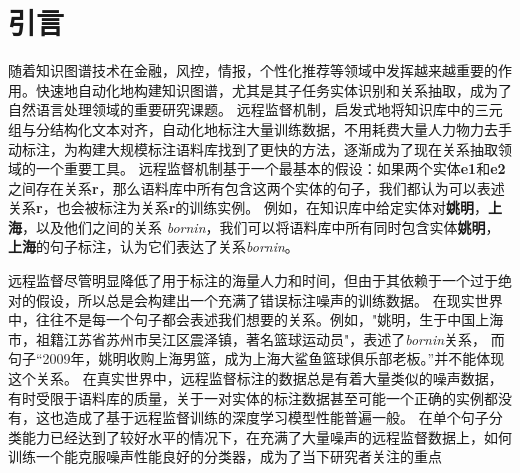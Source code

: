 \documentclass[UTF8]{csoarticle}
\begin{document}




\maketitle



\section{引言}
随着知识图谱技术在金融，风控，情报，个性化推荐等领域中发挥越来越重要的作用。快速地自动化地构建知识图谱，尤其是其子任务实体识别和关系抽取，成为了自然语言处理领域的重要研究课题。
远程监督机制，启发式地将知识库中的三元组与分结构化文本对齐，自动化地标注大量训练数据，不用耗费大量人力物力去手动标注，为构建大规模标注语料库找到了更快的方法，逐渐成为了现在关系抽取领域的一个重要工具。
远程监督机制基于一个最基本的假设：如果两个实体\textbf{e\uline{}1}和\textbf{e\uline{}2}之间存在关系\textbf{r}，那么语料库中所有包含这两个实体的句子，我们都认为可以表述关系\textbf{r}，也会被标注为关系\textbf{r}的训练实例。
例如，在知识库中给定实体对\textbf{姚明}，\textbf{上海}，以及他们之间的关系 \textit{born\uline{}in}，我们可以将语料库中所有同时包含实体\textbf{姚明}， \textbf{上海}的句子标注，认为它们表达了关系\textit{born\uline{}in}。

远程监督尽管明显降低了用于标注的海量人力和时间，但由于其依赖于一个过于绝对的假设，所以总是会构建出一个充满了错误标注噪声的训练数据。
在现实世界中，往往不是每一个句子都会表述我们想要的关系。例如，"姚明，生于中国上海市，祖籍江苏省苏州市吴江区震泽镇，著名篮球运动员"，表述了\textit{born\uline{}in}关系，
而句子“2009年，姚明收购上海男篮，成为上海大鲨鱼篮球俱乐部老板。”并不能体现这个关系。
在真实世界中，远程监督标注的数据总是有着大量类似的噪声数据，有时受限于语料库的质量，关于一对实体的标注数据甚至可能一个正确的实例都没有，这也造成了基于远程监督训练的深度学习模型性能普遍一般。
在单个句子分类能力已经达到了较好水平的情况下，在充满了大量噪声的远程监督数据上，如何训练一个能克服噪声性能良好的分类器，成为了当下研究者关注的重点
\end{document}
